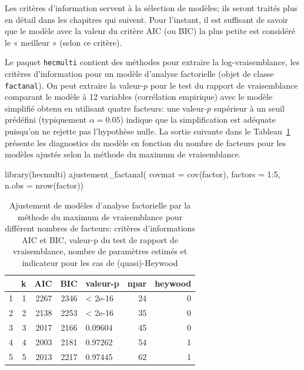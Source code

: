 \documentclass[
  11pt,
  letterpaper,
]{scrbook}
\newenvironment{Shaded}{\begin{snugshade}}{\end{snugshade}}
\newcommand{\AttributeTok}[1]{\textcolor[rgb]{0.40,0.45,0.13}{#1}}
\newcommand{\DecValTok}[1]{\textcolor[rgb]{0.68,0.00,0.00}{#1}}
\newcommand{\FunctionTok}[1]{\textcolor[rgb]{0.28,0.35,0.67}{#1}}
\newcommand{\NormalTok}[1]{\textcolor[rgb]{0.00,0.23,0.31}{#1}}
\newcommand{\SpecialCharTok}[1]{\textcolor[rgb]{0.37,0.37,0.37}{#1}}
\theoremstyle{definition}
\theoremstyle{remark}
\begin{document}
Les critères d'information servent à la sélection de modèles; ils seront
traités plus en détail dans les chapitres qui suivent. Pour l'instant,
il est suffisant de savoir que le modèle avec la valeur du critère AIC
(ou BIC) la plus petite est considéré le « meilleur » (selon ce
critère).

Le paquet \texttt{hecmulti} contient des méthodes pour extraire la
log-vraisemblance, les critères d'information pour un modèle d'analyse
factorielle (objet de classe \texttt{factanal}). On peut extraire la
valeur-\(p\) pour le test du rapport de vraisemblance comparant le
modèle à 12 variables (corrélation empirique) avec le modèle simplifié
obtenu en utilisant quatre facteurs: une valeur-\(p\) supérieur à un
seuil prédéfini (typiquement \(\alpha=0.05\)) indique que la
simplification est adéquate puisqu'on ne rejette pas l'hypothèse nulle.
La sortie suivante dans le Tableau~\ref{tbl-emvcrit} présente les
diagnostics du modèle en fonction du nombre de facteurs pour les modèles
ajustés selon la méthode du maximum de vraisemblance.

\begin{Shaded}
\begin{Highlighting}[]
\FunctionTok{library}\NormalTok{(hecmulti)}
\FunctionTok{ajustement\_factanal}\NormalTok{(}
    \AttributeTok{covmat =} \FunctionTok{cov}\NormalTok{(factor),}
    \AttributeTok{factors =} \DecValTok{1}\SpecialCharTok{:}\DecValTok{5}\NormalTok{,}
    \AttributeTok{n.obs =} \FunctionTok{nrow}\NormalTok{(factor))}
\end{Highlighting}
\end{Shaded}

\hypertarget{tbl-emvcrit}{}
\begin{table}
\caption{\label{tbl-emvcrit}Ajustement de modèles d'analyse factorielle par la méthode du maximum de
vraisemblance pour différent nombres de facteurs: critères
d'informations AIC et BIC, valeur-p du test de rapport de vraisemblance,
nombre de paramètres estimés et indicateur pour les cas de
(quasi)-Heywood }\tabularnewline

\centering
\begin{tabular}{lrrrlrr}
\toprule
  & k & AIC & BIC & valeur-p & npar & heywood\\
\midrule
1 & 1 & 2267 & 2346 & < 2e-16 & 24 & 0\\
2 & 2 & 2138 & 2253 & < 2e-16 & 35 & 0\\
3 & 3 & 2017 & 2166 & 0.09604 & 45 & 0\\
4 & 4 & 2003 & 2181 & 0.97262 & 54 & 1\\
5 & 5 & 2013 & 2217 & 0.97445 & 62 & 1\\
\bottomrule
\end{tabular}
\end{table}
\end{document}
